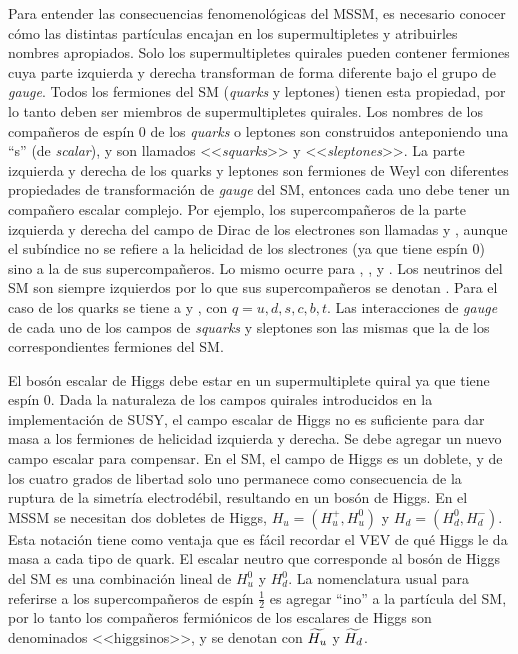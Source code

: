 Para entender las consecuencias fenomenológicas del MSSM, es necesario conocer
cómo las distintas partículas encajan en los supermultipletes y atribuirles nombres
apropiados. Solo los supermultipletes quirales pueden contener fermiones cuya parte
izquierda y derecha transforman de forma diferente bajo el grupo de \emph{gauge}. Todos
los fermiones del SM (\emph{quarks} y leptones) tienen esta propiedad, por lo tanto
deben ser miembros de supermultipletes quirales. Los nombres de los compañeros
de espín 0 de los \emph{quarks} o leptones son construidos anteponiendo una ``s'' (de
\emph{scalar}), y son llamados <<\emph{squarks}>> y <<\emph{sleptones}>>.
La parte izquierda y derecha de los quarks y leptones son
fermiones de Weyl con diferentes propiedades de transformación de \emph{gauge} del SM,
entonces cada uno debe tener un compañero escalar complejo. Por ejemplo, los
supercompañeros de la parte izquierda y derecha del campo de Dirac de los
electrones son llamadas {\selL} y {\selR}, aunque el subíndice no se refiere a
la helicidad de los slectrones (ya que tiene espín 0) sino a la de sus supercompañeros.
Lo mismo ocurre para {\smuL}, {\smuR}, {\stauL} y {\stauR}. Los neutrinos del SM
son siempre izquierdos por lo que sus supercompañeros se denotan {\snu}. Para
el caso de los quarks se tiene a {\squarkL} y {\squarkR}, con $q = u, d, s, c, b, t$. Las
interacciones de \emph{gauge} de cada uno de los campos de \emph{squarks} y sleptones son las
mismas que la de los correspondientes fermiones del SM.

El bosón escalar de Higgs debe estar en un supermultiplete quiral ya que tiene
espín 0. Dada la naturaleza de los campos quirales introducidos en la
implementación de SUSY, el campo escalar de Higgs no es suficiente para dar masa
a los fermiones de helicidad izquierda y derecha. Se debe agregar un nuevo campo
escalar para compensar. En el SM, el campo de Higgs es un doblete, y de los
cuatro grados de libertad solo uno permanece como consecuencia de la ruptura de
la simetría electrodébil, resultando en un bosón de Higgs. En el MSSM se
necesitan dos dobletes de Higgs, $H_u = (H_u^+, H_u^0)$ y $H_d = (H_d^0,
H_d^-)$. Esta notación tiene como ventaja que es fácil recordar el VEV de qué
Higgs le da masa a cada tipo de quark. El escalar neutro que corresponde al
bosón de Higgs del SM es una combinación lineal de $H_u^0$ y $H_d^0$. La
nomenclatura usual para referirse a los supercompa\~neros de espín $\frac{1}{2}$ es
agregar ``ino'' a la partícula del SM, por lo tanto los compañeros fermiónicos
de los escalares de Higgs son denominados <<higgsinos>>, y se denotan con
$\widetilde{H_u}$ y $\widetilde{H_d}$.


